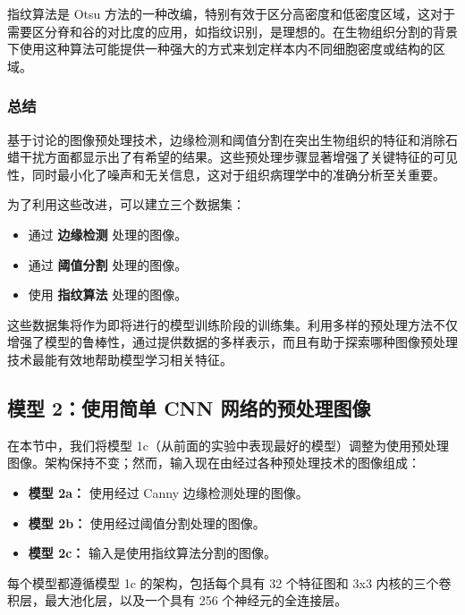 指纹算法是 Otsu 方法的一种改编，特别有效于区分高密度和低密度区域，这对于需要区分脊和谷的对比度的应用，如指纹识别，是理想的。在生物组织分割的背景下使用这种算法可能提供一种强大的方式来划定样本内不同细胞密度或结构的区域。

\subsubsection{总结}

基于讨论的图像预处理技术，边缘检测和阈值分割在突出生物组织的特征和消除石蜡干扰方面都显示出了有希望的结果。这些预处理步骤显著增强了关键特征的可见性，同时最小化了噪声和无关信息，这对于组织病理学中的准确分析至关重要。

为了利用这些改进，可以建立三个数据集：

\begin{itemize}
    \item 通过 \textbf{边缘检测} 处理的图像。
    \item 通过 \textbf{阈值分割} 处理的图像。
    \item 使用 \textbf{指纹算法} 处理的图像。
\end{itemize}

这些数据集将作为即将进行的模型训练阶段的训练集。利用多样的预处理方法不仅增强了模型的鲁棒性，通过提供数据的多样表示，而且有助于探索哪种图像预处理技术最能有效地帮助模型学习相关特征。

\subsection{模型 2：使用简单 CNN 网络的预处理图像}

在本节中，我们将模型 1c（从前面的实验中表现最好的模型）调整为使用预处理图像。架构保持不变；然而，输入现在由经过各种预处理技术的图像组成：

\begin{itemize}
    \item \textbf{模型 2a：} 使用经过 Canny 边缘检测处理的图像。
    \item \textbf{模型 2b：} 使用经过阈值分割处理的图像。
    \item \textbf{模型 2c：} 输入是使用指纹算法分割的图像。
\end{itemize}

每个模型都遵循模型 1c 的架构，包括每个具有 32 个特征图和 3x3 内核的三个卷积层，最大池化层，以及一个具有 256 个神经元的全连接层。


